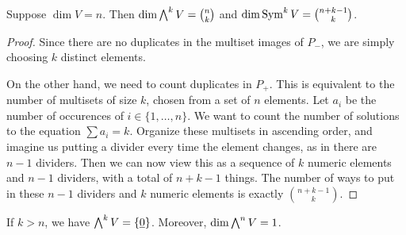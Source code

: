 \begin{corollary}
    Suppose \(\dim V = n\).
    Then \(\dim \operatorname{{\bigwedge}}^k V = \binom{n}{k}\) and \(\dim \operatorname{Sym}^k V = \binom{n+k-1}{k}\).
\end{corollary}
\begin{proof}
    Since there are no duplicates in the multiset images of \(P_-\),
    we are simply choosing \(k\) distinct elements.

    On the other hand, we need to count duplicates in \(P_+\).
    This is equivalent to the number of multisets of size \(k\),
    chosen from a set of \(n\) elements.
    Let \(a_i\) be the number of occurences of \(i \in \{1,\hdots,n\}\).
    We want to count the number of solutions to the equation \(\sum a_i = k\).
    Organize these multisets in ascending order,
    and imagine us putting a divider every time the element changes,
    as in there are \(n-1\) dividers.
    Then we can now view this as a sequence of \(k\) numeric elements and \(n-1\) dividers,
    with a total of \(n+k-1\) things.
    The number of ways to put in these \(n-1\) dividers and \(k\) numeric elements
    is exactly \(\binom{n+k-1}{k}\).
\end{proof}
\begin{remark}
    If \(k > n\), we have \(\operatorname{{\bigwedge}}^k V = \{\underline{0}\}\).
    Moreover, \(\dim \operatorname{{\bigwedge}}^n V = 1\).
\end{remark}

